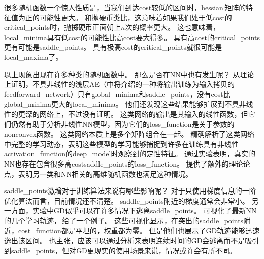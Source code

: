 很多随机函数一个惊人性质是，当我们到达\gls{cost}较低的区间时，\gls{hessian}\,矩阵的特征值为正的可能性更大。
和抛硬币类比，这意味着如果我们处于低\gls{cost}的\gls{critical_points}时，抛掷硬币正面朝上$n$次的概率更大。
这也意味着，\gls{local_minima}具有低\gls{cost}的可能性比高\gls{cost}要大得多。
具有高\gls{cost}的\gls{critical_points}更有可能是\gls{saddle_points}。
具有极高\gls{cost}的\gls{critical_points}就很可能是\gls{local_maxima}了。


以上现象出现在许多种类的随机函数中。
那么是否在\gls{NN}中也有发生呢？
\cite{Baldi89}从理论上证明，不具非线性的浅层\gls{AE}（中将介绍的一种将输出训练为输入拷贝的\gls{feedforward_network}）只有\gls{global_minima}和\gls{saddle_points}，没有\gls{cost}比\gls{global_minima}更大的\gls{local_minima}。
他们还发现这些结果能够扩展到不具非线性的更深的网络上，不过没有证明。
这类网络的输出是其输入的线性函数，但它们仍然有助于分析非线性\gls{NN}模型，因为它们的\gls{loss_function}是关于参数的\gls{nonconvex}函数。
这类网络本质上是多个矩阵组合在一起。
\cite{Saxe-et-al-ICLR13}精确解析了这类网络中完整的学习动态，表明这些模型的学习能够捕捉到许多在训练具有非线性\gls{activation_function}的\gls{deep_model}时观察到的定性特征。
\cite{Dauphin-et-al-NIPS2014-small}通过实验表明，真实的\gls{NN}也存在包含很多高\gls{cost}\gls{saddle_points}的\gls{loss_function}。
\cite{Choromanska-et-al-AISTATS2015}提供了额外的理论论点，表明另一类和\gls{NN}相关的高维随机函数也满足这种情况。


\gls{saddle_points}激增对于训练算法来说有哪些影响呢？
对于只使用梯度信息的一阶优化算法而言，目前情况还不清楚。
\gls{saddle_points}附近的梯度通常会非常小。
另一方面，实验中\gls{GD}似乎可以在许多情况下逃离\gls{saddle_points}。
\cite{GoodfellowOptimization15}可视化了最新\gls{NN}的几个学习轨迹，\,给了一个例子。
这些可视化显示，在突出的\gls{saddle_points}附近，\gls{cost_function}都是平坦的，权重都为零。
但是他们也展示了\gls{GD}轨迹能够迅速逸出该区间。
\cite{GoodfellowOptimization15}也主张，应该可以通过分析来表明连续时间的\gls{GD}会逃离而不是吸引到\gls{saddle_points}，但对\gls{GD}更现实的使用场景来说，情况或许会有所不同。



